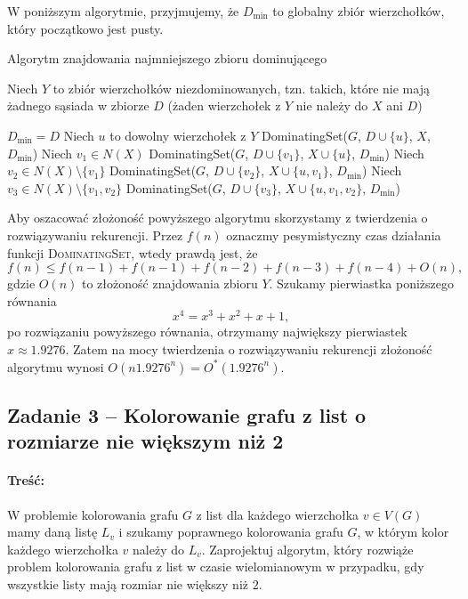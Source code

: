 W poniższym algorytmie, przyjmujemy, że $D_{\min}$ to globalny zbiór
wierzchołków, który początkowo jest pusty.
\begin{algorithm}[H]
	\caption{Algorytm znajdowania najmniejszego zbioru dominującego}
	\begin{algorithmic}[1]
		\State \Return
		\EndIf
		\State Niech $Y$ to zbiór wierzchołków niezdominowanych, tzn. takich, które nie mają żadnego sąsiada w zbiorze $D$ (żaden
		wierzchołek z $Y$ nie należy do $X$ ani $D$)		

		\State $D_{\min} = D$
		\EndIf
		\State \Return
		\EndIf
		\State Niech $u$ to dowolny wierzchołek z $Y$
		\State DominatingSet($G$, $D \cup \{u\}$, $X$, $D_{\min}$)
		\State Niech $v_1 \in N(X)$
		\State DominatingSet($G$, $D \cup \{v_1\}$, $X \cup \{u\}$, $D_{\min}$)
		\EndIf
		\EndIf
		\State Niech $v_2 \in N(X) \setminus \{v_1\}$
		\State DominatingSet($G$, $D \cup \{v_2\}$, $X \cup \{u, v_1\}$, $D_{\min}$)
		\EndIf
		\EndIf
		\State Niech $v_3 \in N(X) \setminus \{v_1, v_2\}$
		\State DominatingSet($G$, $D \cup \{v_3\}$, $X \cup \{u, v_1, v_2\}$, $D_{\min}$)
		\EndIf
		\EndIf
		\EndProcedure		
	\end{algorithmic}
\end{algorithm}

Aby oszacować złożoność powyższego algorytmu skorzystamy z 
twierdzenia o rozwiązywaniu rekurencji. Przez $f(n)$
oznaczmy pesymistyczny czas działania funkcji \textsc{DominatingSet},
wtedy prawdą jest, że
\[f(n) \leq f(n-1) + f(n-1) + f(n-2) + f(n-3) + f(n-4) + O(n),\]
gdzie $O(n)$ to złożoność znajdowania zbioru $Y$. 
Szukamy pierwiastka poniższego równania
\[x^4 = x^3 + x^2 + x + 1,\]
po rozwiązaniu powyższego równania, otrzymamy największy
pierwiastek $x \approx 1.9276$. Zatem na mocy twierdzenia
o rozwiązywaniu rekurencji złożoność algorytmu wynosi $O(n1.9276^n) = O^*(1.9276^n)$.

\subsection{Zadanie 3 -- Kolorowanie grafu z list o rozmiarze nie większym niż 2}
\paragraph{Treść:} W problemie kolorowania grafu $G$ z list dla każdego wierzchołka 
$v \in V(G)$ mamy daną listę $L_v$ i
szukamy poprawnego kolorowania grafu $G$, w którym kolor każdego wierzchołka $v$ należy do $L_v$.
Zaprojektuj algorytm, który rozwiąże problem kolorowania grafu z list w czasie wielomianowym w przypadku, gdy
wszystkie listy mają rozmiar nie większy niż $2$.

